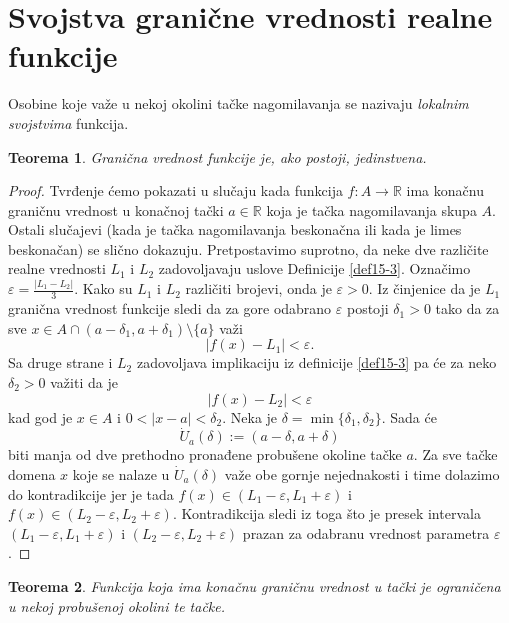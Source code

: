 \documentclass[a4paper,12pt]{article}
\theoremstyle{plain}
\newtheorem{theorem}{Teorema}[section]
\theoremstyle{definition}
\theoremstyle{remark}
\begin{document}
\section{Svojstva granične vrednosti realne funkcije}
Osobine koje važe u nekoj okolini tačke nagomilavanja se nazivaju \textit{lokalnim svojstvima} funkcija.
\begin{theorem}
    Granična vrednost funkcije je, ako postoji, jedinstvena.
\end{theorem}

\begin{proof} Tvrđenje ćemo pokazati u slučaju kada funkcija $f : A \to 
\mathbb{R}$ ima konačnu graničnu vrednost u konačnoj tački $a \in \mathbb{R}$ 
koja je tačka nagomilavanja skupa $A$. Ostali slučajevi (kada je tačka 
nagomilavanja beskonačna ili kada je limes beskonačan) se slično dokazuju.
 Pretpostavimo suprotno, da neke dve različite realne vrednosti 
$L_1$ i $L_2$ zadovoljavaju uslove Definicije \ref{def15-3}. 
Označimo $\displaystyle
 \varepsilon = \frac{|L_1 - L_2|}{3}$. Kako su $L_1$ i $L_2$ različiti 
 brojevi, onda je $\varepsilon > 0$.
Iz činjenice da je $L_1$ granična vrednost funkcije sledi da za gore odabrano
 $\varepsilon$ postoji $\delta_1 > 0$ tako da za sve $x \in A \cap 
 (a - \delta_1, a + \delta_1) \setminus \{a\}$ važi
\[ |f(x) - L_1| < \varepsilon. \]
Sa druge strane i $L_2$ zadovoljava implikaciju iz definicije \ref{def15-3} pa će za neko 
$\delta_2 > 0$ važiti da je
\[ |f(x) - L_2| < \varepsilon \]
kad god je $x \in A$ i $0 < |x - a| < \delta_2$.
Neka je $\delta = \min\{\delta_1, \delta_2\}$. Sada će
\[ \dot{U}_a(\delta) := (a - \delta, a + \delta) \]
biti manja od dve prethodno pronađene probušene okoline tačke $a$. 
Za sve tačke domena $x$ koje se nalaze u $\dot{U}_a(\delta)$ važe obe
gornje nejednakosti i time dolazimo do kontradikcije jer je tada $f(x) \in 
(L_1 - \varepsilon, L_1 + \varepsilon)$ i $f(x) \in 
(L_2 - \varepsilon, L_2 + \varepsilon)$. Kontradikcija sledi iz toga što
 je presek intervala $(L_1 - \varepsilon, L_1 + \varepsilon)$ i $(L_2 - 
 \varepsilon, L_2 + \varepsilon)$ prazan za odabranu vrednost parametra 
 $\varepsilon$.
\end{proof}
\begin{theorem}
    Funkcija koja ima konačnu graničnu vrednost u tački je ograničena u nekoj probušenoj okolini te tačke.
\end{theorem}
\end{document}
